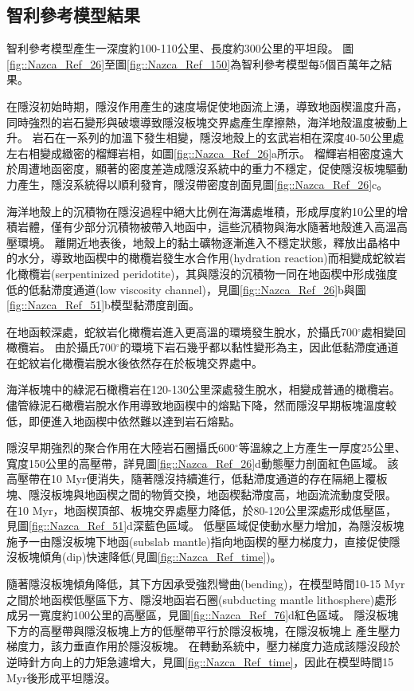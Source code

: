 \subsection{智利參考模型結果}\label{智利參考模型結果}
智利參考模型產生一深度約100-110公里、長度約300公里的平坦段。
圖\ref{fig::Nazca_Ref_26}至圖\ref{fig::Nazca_Ref_150}為智利參考模型每5個百萬年之結果。

在隱沒初始時期，隱沒作用產生的速度場促使地函流上湧，導致地函楔溫度升高，同時強烈的岩石變形與破壞導致隱沒板塊交界處產生摩擦熱，海洋地殼溫度被動上升。
岩石在一系列的加溫下發生相變，隱沒地殼上的玄武岩相在深度40-50公里處左右相變成緻密的榴輝岩相，如圖\ref{fig::Nazca_Ref_26}a所示。
榴輝岩相密度遠大於周遭地函密度，顯著的密度差造成隱沒系統中的重力不穩定，促使隱沒板塊驅動力產生，隱沒系統得以順利發育，隱沒帶密度剖面見圖\ref{fig::Nazca_Ref_26}c。

海洋地殼上的沉積物在隱沒過程中絕大比例在海溝處堆積，形成厚度約10公里的增積岩體，僅有少部分沉積物被帶入地函中，這些沉積物與海水隨著地殼進入高溫高壓環境。
離開近地表後，地殼上的黏土礦物逐漸進入不穩定狀態，釋放出晶格中的水分，導致地函楔中的橄欖岩發生水合作用(hydration reaction)而相變成蛇紋岩化橄欖岩(serpentinized peridotite)，其與隱沒的沉積物一同在地函楔中形成強度低的低黏滯度通道(low viscosity channel)，見圖\ref{fig::Nazca_Ref_26}b與圖\ref{fig::Nazca_Ref_51}b模型黏滯度剖面。

在地函較深處，蛇紋岩化橄欖岩進入更高溫的環境發生脫水，於攝氏700$^{\circ}$處相變回橄欖岩。
由於攝氏700$^{\circ}$的環境下岩石幾乎都以黏性變形為主，因此低黏滯度通道在蛇紋岩化橄欖岩脫水後依然存在於板塊交界處中。

海洋板塊中的綠泥石橄欖岩在120-130公里深處發生脫水，相變成普通的橄欖岩。
儘管綠泥石橄欖岩脫水作用導致地函楔中的熔點下降，然而隱沒早期板塊溫度較低，即便進入地函楔中依然難以達到岩石熔點。

隱沒早期強烈的聚合作用在大陸岩石圈攝氏600$^{\circ}$等溫線之上方產生一厚度25公里、寬度150公里的高壓帶，詳見圖\ref{fig::Nazca_Ref_26}d動態壓力剖面紅色區域。
該高壓帶在10 Myr便消失，隨著隱沒持續進行，低黏滯度通道的存在隔絕上覆板塊、隱沒板塊與地函楔之間的物質交換，地函楔黏滯度高，地函流流動度受限。
在10 Myr，地函楔頂部、板塊交界處壓力降低，於80-120公里深處形成低壓區，見圖\ref{fig::Nazca_Ref_51}d深藍色區域。 
低壓區域促使動水壓力增加，為隱沒板塊施予一由隱沒板塊下地函(subslab mantle)指向地函楔的壓力梯度力，直接促使隱沒板塊傾角(dip)快速降低(見圖\ref{fig::Nazca_Ref_time})。

隨著隱沒板塊傾角降低，其下方因承受強烈彎曲(bending)，在模型時間10-15 Myr之間於地函楔低壓區下方、隱沒地函岩石圈(subducting mantle lithosphere)處形成另一寬度約100公里的高壓區，見圖\ref{fig::Nazca_Ref_76}d紅色區域。
隱沒板塊下方的高壓帶與隱沒板塊上方的低壓帶平行於隱沒板塊，在隱沒板塊上
產生壓力梯度力，該力垂直作用於隱沒板塊。
在轉動系統中，壓力梯度力造成該隱沒段於逆時針方向上的力矩急遽增大，見圖\ref{fig::Nazca_Ref_time}，因此在模型時間15 Myr後形成平坦隱沒。

